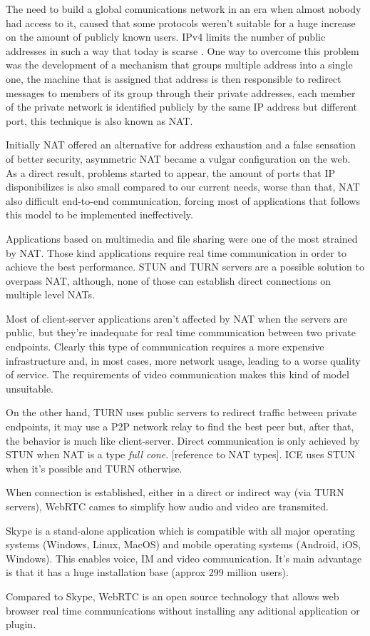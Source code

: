 The need to build a global comunications network in an era when almost nobody had access to it, caused that some protocols weren't suitable for a huge increase on the amount of publicly known users. \ac{IPv4} limits the number of public addresses in such a way that today is scarse \cite{ipv4}. One way to overcome this problem was the development of a mechanism that groups multiple address into a single one, the machine that is assigned that address is then responsible to redirect messages to members of its group through their private addresses, each member of the private network is identified publicly by the same \ac{IP} address but different port, this technique is also known as \ac{NAT}.

Initially \ac{NAT} offered an alternative for address exhaustion and a false sensation of better security, asymmetric \ac{NAT} became a vulgar configuration on the web. As a direct result, problems started to appear, the amount of ports that \ac{IP} disponibilizes is also small compared to our current needs, worse than that, \ac{NAT} also difficult end-to-end communication, forcing most of applications that follows this model to be implemented ineffectively.

Applications based on multimedia and file sharing were one of the most strained by \ac{NAT}. Those kind applications require real time communication in order to achieve the best performance. \ac{STUN} and \ac{TURN} \cite{natvoip} servers are a possible solution to overpass \ac{NAT}, although, none of those can establish direct connections on multiple level \ac{NAT}s.

Most of client-server applications aren't affected by \ac{NAT} when the servers are public, but they're inadequate for real time communication between two private endpoints. Clearly this type of communication requires a more expensive infrastructure and, in most cases, more network usage, leading to a worse quality of service. The requirements of video communication makes this kind of model unsuitable.

On the other hand, \ac{TURN} uses public servers to redirect traffic between private endpoints, it may use a P2P network relay to find the best peer but, after that, the behavior is much like client-server. Direct communication is only achieved by \ac{STUN} when \ac{NAT} is a type \textit{full cone}. {\color{red} [reference to \ac{NAT} types]}. \ac{ICE} uses \ac{STUN} when it's possible and \ac{TURN} otherwise.

When connection is established, either in a direct or indirect way (via \ac{TURN} servers), \ac{WebRTC} cames to simplify how audio and video are transmited.

{\color{blue}Skype is a stand-alone application which is compatible with all major operating systems (Windows, Linux, MacOS) and mobile operating systems (Android, iOS, Windows). This enables voice, IM and video communication. It's main advantage is that it has a huge installation base (approx 299 million users).}

Compared to Skype, \ac{WebRTC} is an open source technology that allows web browser real time communications without installing any aditional application or plugin.
